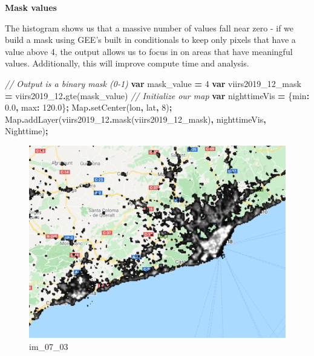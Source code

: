 \documentclass[
]{article}
\newenvironment{Shaded}{\begin{snugshade}}{\end{snugshade}}
\newcommand{\BuiltInTok}[1]{#1}
\newcommand{\CommentTok}[1]{\textcolor[rgb]{0.56,0.35,0.01}{\textit{#1}}}
\newcommand{\DataTypeTok}[1]{\textcolor[rgb]{0.13,0.29,0.53}{#1}}
\newcommand{\DecValTok}[1]{\textcolor[rgb]{0.00,0.00,0.81}{#1}}
\newcommand{\FloatTok}[1]{\textcolor[rgb]{0.00,0.00,0.81}{#1}}
\newcommand{\FunctionTok}[1]{\textcolor[rgb]{0.00,0.00,0.00}{#1}}
\newcommand{\KeywordTok}[1]{\textcolor[rgb]{0.13,0.29,0.53}{\textbf{#1}}}
\newcommand{\NormalTok}[1]{#1}
\newcommand{\OperatorTok}[1]{\textcolor[rgb]{0.81,0.36,0.00}{\textbf{#1}}}
\newcommand{\StringTok}[1]{\textcolor[rgb]{0.31,0.60,0.02}{#1}}
\begin{document}
\textbf{Mask values}

The histogram shows us that a massive number of values fall near zero - if we build a mask using GEE's built in conditionals to keep only pixels that have a value above 4, the output allows us to focus in on areas that have meaningful values. Additionally, this will improve compute time and analysis.

\begin{Shaded}
\begin{Highlighting}[]
\CommentTok{// Output is a binary mask (0{-}1)}
\KeywordTok{var}\NormalTok{ mask\_value }\OperatorTok{=} \DecValTok{4}
\KeywordTok{var}\NormalTok{ viirs2019\_12\_mask }\OperatorTok{=}\NormalTok{ viirs2019\_12}\OperatorTok{.}\FunctionTok{gte}\NormalTok{(mask\_value)}
\CommentTok{// Initialize our map}
\KeywordTok{var}\NormalTok{ nighttimeVis }\OperatorTok{=}\NormalTok{ \{}\DataTypeTok{min}\OperatorTok{:} \FloatTok{0.0}\OperatorTok{,} \DataTypeTok{max}\OperatorTok{:} \FloatTok{120.0}\NormalTok{\}}\OperatorTok{;}
\BuiltInTok{Map}\OperatorTok{.}\FunctionTok{setCenter}\NormalTok{(lon}\OperatorTok{,}\NormalTok{ lat}\OperatorTok{,} \DecValTok{8}\NormalTok{)}\OperatorTok{;}
\BuiltInTok{Map}\OperatorTok{.}\FunctionTok{addLayer}\NormalTok{(viirs2019\_12}\OperatorTok{.}\FunctionTok{mask}\NormalTok{(viirs2019\_12\_mask)}\OperatorTok{,}\NormalTok{ nighttimeVis}\OperatorTok{,}  \StringTok{\textquotesingle{}Nighttime\textquotesingle{}}\NormalTok{)}\OperatorTok{;}
\end{Highlighting}
\end{Shaded}

\begin{figure}
\centering
\includegraphics{./im/im_07_03.png}
\caption{im\_07\_03}
\end{figure}
\end{document}
